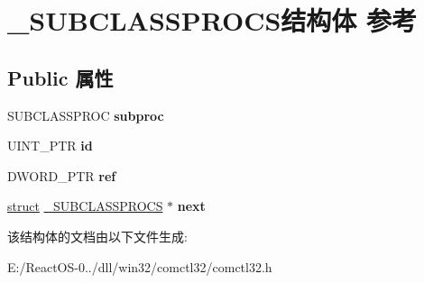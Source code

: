 \hypertarget{struct___s_u_b_c_l_a_s_s_p_r_o_c_s}{}\section{\+\_\+\+S\+U\+B\+C\+L\+A\+S\+S\+P\+R\+O\+C\+S结构体 参考}
\label{struct___s_u_b_c_l_a_s_s_p_r_o_c_s}
\subsection*{Public 属性}
\begin{DoxyCompactItemize}
\item 
\mbox{\label{struct___s_u_b_c_l_a_s_s_p_r_o_c_s_ae61f1514312092127ee2bd7f405565b5}} 
S\+U\+B\+C\+L\+A\+S\+S\+P\+R\+OC {\bfseries subproc}
\item 
\mbox{\label{struct___s_u_b_c_l_a_s_s_p_r_o_c_s_a10c97d8516271707e370c3eac28b9713}} 
U\+I\+N\+T\+\_\+\+P\+TR {\bfseries id}
\item 
\mbox{\label{struct___s_u_b_c_l_a_s_s_p_r_o_c_s_a8e4b623719359596c153f91074ac847c}} 
D\+W\+O\+R\+D\+\_\+\+P\+TR {\bfseries ref}
\item 
\mbox{\label{struct___s_u_b_c_l_a_s_s_p_r_o_c_s_a285602216b7939a5c7fe334c0f7b7bd8}} 
\hyperlink{interfacestruct}{struct} \hyperlink{struct___s_u_b_c_l_a_s_s_p_r_o_c_s}{\+\_\+\+S\+U\+B\+C\+L\+A\+S\+S\+P\+R\+O\+CS} $\ast$ {\bfseries next}
\end{DoxyCompactItemize}


该结构体的文档由以下文件生成\+:\begin{DoxyCompactItemize}
\item 
E\+:/\+React\+O\+S-\/0../dll/win32/comctl32/comctl32.\+h\end{DoxyCompactItemize}
